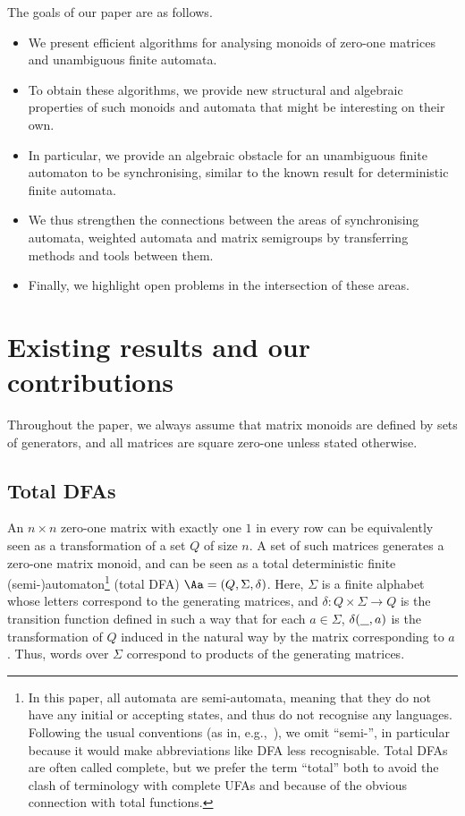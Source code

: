The goals of our paper are as follows.
\begin{itemize}
    \item We present efficient algorithms for analysing monoids of zero-one matrices and unambiguous finite automata.

    \item To obtain these algorithms, we provide new structural and algebraic properties of such monoids and automata that might be interesting on their own.

    \item In particular, we provide an algebraic obstacle for an unambiguous finite automaton to be synchronising, similar to the known result for deterministic finite automata. 

    \item We thus strengthen the connections between the areas of synchronising automata, weighted automata and matrix semigroups by transferring methods and tools between them.

    \item Finally, we highlight open problems in the intersection of these areas.
\end{itemize}


\section{Existing results and our contributions}\label{sec-existing}

Throughout the paper, we always assume that matrix monoids are defined by sets of generators, and 
all matrices are square zero-one unless stated otherwise.

\subsection{Total DFAs}

An $n \times n$ zero-one matrix with exactly one $1$ in every row can be equivalently seen as a transformation of a set $Q$ of size $n$. A set of such matrices generates a zero-one matrix monoid, and can be seen as a total deterministic finite (semi-)automaton\footnote{\label{footnote-semi}In this paper, all automata are semi-automata, meaning that they do not have any initial or accepting states, and thus do not recognise any languages. Following the usual conventions (as in, e.g.,~\cite{Berstel2010}), we omit ``semi-'', in particular because it would make abbreviations like DFA less recognisable. Total DFAs are often called complete, but we prefer the
term “total” both to avoid the clash of terminology with complete UFAs and because of the obvious connection
with total functions.} (total DFA) $\Aa = (Q, \Sigma, \delta)$. Here, $\Sigma$ is a finite alphabet whose letters correspond to the generating matrices, and $\delta: Q \times \Sigma \to Q$ is the transition function defined in such a way that for each $a \in \Sigma$, $\delta(\underline{\hspace{0.25cm}}, a)$ is the transformation of $Q$ induced in the natural way by the matrix corresponding to $a$. Thus, words over $\Sigma$ correspond to products of the generating matrices.

